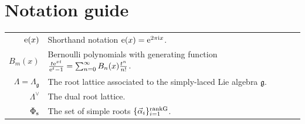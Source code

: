 \documentclass[pdftex]{sigma}
\def\al{\alpha}
\theoremstyle{definition}
\numberwithin{equation}{section}
\begin{document}
\section{Notation guide}
\label{sec:notation}
\begin{table}[!h]\renewcommand{\arraystretch}{1.25}\centering
	\begin{tabular}{r l}
		${\rm e}(x)$ & Shorthand notation ${\rm e}(x)={\rm e}^{2\pi\mathrm{i}x}$.
		\\
		$B_m(x)$ & Bernoulli polynomials with generating function $\frac{t{\rm e}^{xt}}{ {\rm e}^t-1} = \sum_{n=0}^\infty B_n(x)\frac{t^n}{ n!}$.
		\\
		$\Lambda=\Lambda_{\mathfrak{g}}$ & The root lattice associated to the simply-laced Lie algebra $\mathfrak{g}$.
\\
		$\Lambda^{\vee}$ & The dual root lattice.
\\
		$\Phi_{\rm s}$ & The set of simple roots $\{\vec{\al}_i\}_{i=1}^{\rm rankG}$.
			\end{tabular}
\end{table}
\end{document}
